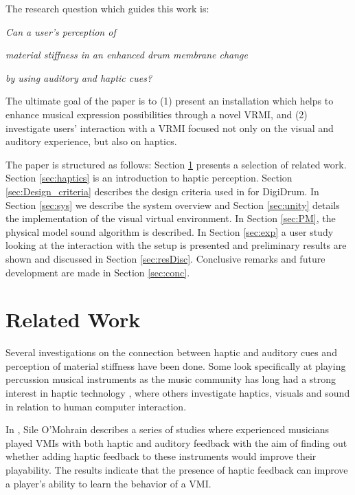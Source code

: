 \documentclass{article}
\begin{document}
The research question which guides this work is:
\vspace{0.2cm}

\centerline{\it Can a user's perception of}

\centerline{\it material stiffness in an enhanced drum membrane change}

\centerline{\it by using auditory and haptic cues?}
\vspace{0.2cm}
\noindent 

The ultimate goal of the paper is to (1) present an installation which helps to enhance musical expression possibilities through a novel VRMI, and (2) investigate users' interaction with a VRMI focused not only on the visual and auditory experience, but also on haptics.

The paper is structured as follows: 
 Section \ref{sec:relwork} presents a selection of related work. Section \ref{sec:haptics} is an introduction to haptic perception. Section \ref{sec:Design_criteria} describes the design criteria used in for DigiDrum. %
 In Section \ref{sec:sys} we describe the system overview and Section \ref{sec:unity} details the implementation of the visual virtual environment. In Section \ref{sec:PM}, the physical model sound algorithm is described. 
In Section \ref{sec:exp} a user study looking at the interaction with the setup is presented and preliminary results are shown and discussed in Section \ref{sec:resDisc}. Conclusive remarks and future development are made in Section \ref{sec:conc}.

\section{Related Work}\label{sec:relwork}

Several investigations on the connection between haptic and auditory cues and perception of material stiffness have been done. Some look specifically at playing percussion musical instruments as the music community has long had a strong interest in haptic technology \cite{Berdahl2008PracticalHA}, where others investigate haptics, visuals and sound in relation to human computer interaction. 

In \cite{O'Mohdrain:2001}, Sile O'Mohrain describes a series of studies where experienced musicians played VMIs with both haptic and auditory feedback with the aim of finding out whether adding haptic feedback to these instruments would improve their playability. The results indicate that the presence of haptic feedback can improve a player's ability to learn the behavior of a VMI.
\end{document}

